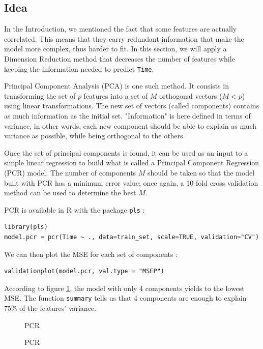 \documentclass[]{report}
\newcommand{\inputtikz}[2]{%
	\scalebox{#1}{}  
}
\begin{document}
\subsection{Idea}
In the Introduction, we mentioned the fact that some features are actually correlated. This means that they carry redundant information that make the model more complex, thus harder to fit. In this section, we will apply a Dimension Reduction method that decreases the number of features while keeping the information needed to predict \texttt{Time}.

Principal Component Analysis (PCA) is one such method. It consists in transforming the set of $p$ features into a set of $M$ orthogonal vectors ($M < p$) using linear transformations. The new set of vectors (called components) contains as much information as the initial set. "Information" is here defined in terms of variance, in other words, each new component should be able to explain as much variance as possible, while being orthogonal to the others.

Once the set of principal components is found, it can be used as an input to a simple linear regression to build what is called a Principal Component Regression (PCR) model. The number of components $M$ should be taken so that the model built with PCR has a minimum error value; once again, a 10 fold cross validation method can be used to determine the best $M$.

PCR is available in R with the package \texttt{pls} :
\begin{lstlisting}
library(pls)
model.pcr = pcr(Time ~ ., data=train_set, scale=TRUE, validation="CV")
\end{lstlisting}

We can then plot the MSE for each set of components :
\begin{lstlisting}
validationplot(model.pcr, val.type = "MSEP")
\end{lstlisting}

According to figure \ref{fig:pcr_cv}, the model with only 4 components yields to the lowest MSE. The function \texttt{summary} tells us that 4 components are enough to explain 75\% of the features' variance. 

\begin{figure}[!h]
	\centering
	\inputtikz{0.5}{Figures/pcr_cv.tex}
	\caption{PCR}
	\label{fig:pcr_cv}
\end{figure}

\begin{figure}[!h]
	\centering
	\inputtikz{0.5}{Figures/pcr_hist.tex}
	\caption{PCR}
	\label{fig:pcr_hist}
\end{figure}
\end{document}

